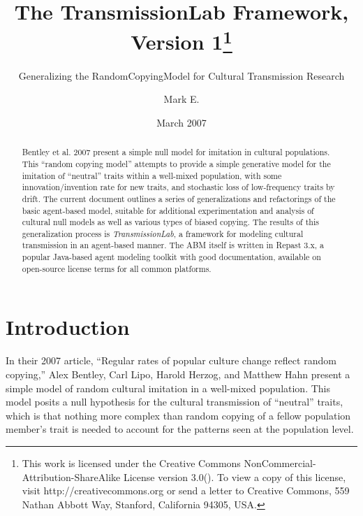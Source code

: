 \documentclass{kluwer-mem-copyright}
\begin{document}
\begin{article}
\begin{opening}
\title{The TransmissionLab Framework, Version 1\thanks{This work is licensed under the Creative Commons NonCommercial-Attribution-ShareAlike License version 3.0(\byncsa). 
To view a copy of this license, visit http://creativecommons.org or send a letter to 
Creative Commons, 559 Nathan Abbott Way, Stanford, California 94305, USA.}}
\subtitle{Generalizing the RandomCopyingModel for Cultural Transmission Research}


\author{Mark E. }  


\date{March 2007}

\begin{abstract}
Bentley et al. 2007 present a simple null model for imitation in cultural populations.  
This ``random copying model'' attempts to provide a simple generative model for the imitation of 
``neutral'' traits within a well-mixed population, with some innovation/invention rate for 
new traits, and stochastic loss of low-frequency traits by drift.  The current document 
outlines a series of generalizations and refactorings of the basic agent-based model,
suitable for additional
experimentation and analysis of cultural null models as well as various types of biased copying.   The results of this generalization process is \emph{TransmissionLab}, a framework for modeling cultural transmission in an agent-based manner.  
The ABM itself is written in Repast 3.x, a popular Java-based agent modeling toolkit with good 
documentation, available on open-source license terms for all common platforms.
\end{abstract}


\end{opening}

\section{Introduction}
In their 2007 article, ``Regular rates of popular culture change reflect random copying,'' Alex Bentley, 
Carl Lipo, Harold Herzog, and Matthew Hahn present a simple model of random cultural imitation in a well-mixed
population.  This model posits a null hypothesis for the cultural transmission of ``neutral'' traits, which 
is that nothing more complex than random copying of a fellow population member's trait is needed to 
account for the patterns seen at the population level.  



\end{article}
\end{document}
